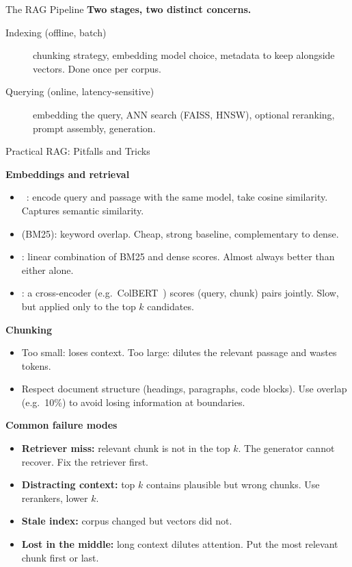 \begin{frame}{The RAG Pipeline}
  \vspace{0.4em}
  \textbf{Two stages, two distinct concerns.}
  \begin{description}
    \item[Indexing (offline, batch)] chunking strategy, embedding model
      choice, metadata to keep alongside vectors. Done once per corpus.
    \item[Querying (online, latency-sensitive)] embedding the query, ANN
      search (FAISS, HNSW), optional reranking, prompt assembly, generation.
  \end{description}
\end{frame}

\begin{frame}{Practical RAG: Pitfalls and Tricks}

  \textbf{Embeddings and retrieval}
  \begin{itemize}[nosep]
    \item {}~\cite{karpukhin2020dpr}: encode query and passage
      with the same model, take cosine similarity. Captures semantic similarity.
    \item {} (BM25): keyword overlap. Cheap, strong baseline,
      complementary to dense.
    \item {}: linear combination of BM25 and dense scores. Almost always
      better than either alone.
    \item {}: a cross-encoder (e.g.\ ColBERT~\cite{khattab2020colbert})
      scores (query, chunk) pairs jointly. Slow, but applied only to the top
      $k$ candidates.
  \end{itemize}

  \vspace{0.3em}
  \textbf{Chunking}
  \begin{itemize}[nosep]
    \item Too small: loses context. Too large: dilutes the relevant passage and wastes tokens.
    \item Respect document structure (headings, paragraphs, code blocks). Use overlap (e.g.\ 10\%) to avoid losing information at boundaries.
  \end{itemize}

  \vspace{0.3em}
  \textbf{Common failure modes}
  \begin{itemize}[nosep]
    \item \textbf{Retriever miss:} relevant chunk is not in the top $k$. The generator cannot recover. Fix the retriever first.
    \item \textbf{Distracting context:} top $k$ contains plausible but wrong chunks. Use rerankers, lower $k$.
    \item \textbf{Stale index:} corpus changed but vectors did not.
    \item \textbf{Lost in the middle:} long context dilutes attention. Put the most relevant chunk first or last.
  \end{itemize}
\end{frame}

